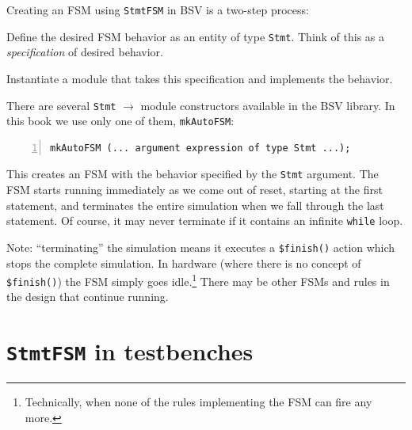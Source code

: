 \label{Sec_AutoFSM}


Creating an FSM using \verb|StmtFSM| in BSV is a two-step process:

\begin{tightlist}

 \item Define the desired FSM behavior as an entity of type
       \verb|Stmt|.  Think of this as a \emph{specification} of
       desired behavior.

 \item Instantiate a module that takes this specification and
       implements the behavior.

\end{tightlist}

There are several \verb|Stmt| $\longrightarrow$ module constructors
available in the BSV library.  In this book we use only one of them,
\verb|mkAutoFSM|:

{\small
\begin{Verbatim}[frame=single, numbers=left]
   mkAutoFSM (... argument expression of type Stmt ...);
\end{Verbatim}
}

This creates an FSM with the behavior specified by the \verb|Stmt|
argument.  The FSM starts running immediately as we come out of reset,
starting at the first statement, and terminates the entire simulation
when we fall through the last statement.  Of course, it may never
terminate if it contains an infinite {\tt while} loop.

Note: ``terminating'' the simulation means it executes a
\verb|$finish()| action which stops the complete simulation.  In
hardware (where there is no concept of \verb|$finish()|) the FSM
simply goes idle.\footnote{Technically, when none of the rules implementing
the FSM can fire any more.}  There may be other FSMs and rules in the
design that continue running.


\section{{\tt StmtFSM} in testbenches}

\label{Sec_StmtFSM_in_testbenches}


